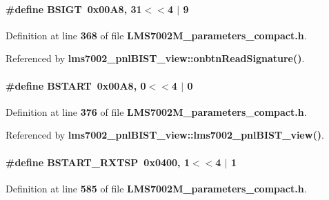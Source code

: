 \paragraph[{B\+S\+I\+GT}]{\setlength{\rightskip}{0pt plus 5cm}\#define B\+S\+I\+GT~0x00\+A8, 31$<$$<$4 $\vert$  9}\label{LMS7002M__parameters__compact_8h_a3a1942114d53dc6b3e117694927c213f}


Definition at line {\bf 368} of file {\bf L\+M\+S7002\+M\+\_\+parameters\+\_\+compact.\+h}.



Referenced by {\bf lms7002\+\_\+pnl\+B\+I\+S\+T\+\_\+view\+::onbtn\+Read\+Signature()}.

\paragraph[{B\+S\+T\+A\+RT}]{\setlength{\rightskip}{0pt plus 5cm}\#define B\+S\+T\+A\+RT~0x00\+A8, 0$<$$<$4 $\vert$  0}\label{LMS7002M__parameters__compact_8h_a9a9022fc69804119b9c14a5137532678}


Definition at line {\bf 376} of file {\bf L\+M\+S7002\+M\+\_\+parameters\+\_\+compact.\+h}.



Referenced by {\bf lms7002\+\_\+pnl\+B\+I\+S\+T\+\_\+view\+::lms7002\+\_\+pnl\+B\+I\+S\+T\+\_\+view()}.

\paragraph[{B\+S\+T\+A\+R\+T\+\_\+\+R\+X\+T\+SP}]{\setlength{\rightskip}{0pt plus 5cm}\#define B\+S\+T\+A\+R\+T\+\_\+\+R\+X\+T\+SP~0x0400, 1$<$$<$4 $\vert$  1}\label{LMS7002M__parameters__compact_8h_a96dbad1303d9d50a7b020997fec1fb1a}


Definition at line {\bf 585} of file {\bf L\+M\+S7002\+M\+\_\+parameters\+\_\+compact.\+h}.



